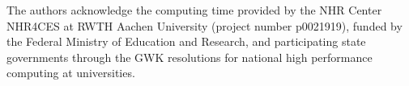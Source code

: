 \documentclass[11pt,a4paper]{article}
\begin{document}
The authors acknowledge the computing time provided by the NHR Center NHR4CES at RWTH Aachen University (project number p0021919), funded by the Federal Ministry of Education and Research, and participating state governments through the GWK resolutions for national high performance computing at universities.







\end{document}
